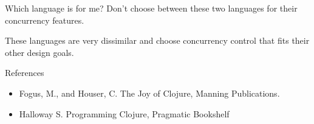 \documentclass[xcolor=dvipsnames]{beamer}
\begin{document}
	\begin{frame}{Which language is for me?}
	Don't choose between these two languages for their concurrency features.
	
	These languages are very dissimilar and choose concurrency control that fits their other design goals. 
	\end{frame}
	
	\begin{frame}{References}
	\begin{itemize}
	\item Fogus, M., and Houser, C. The Joy of Clojure, Manning Publications.
	\item Halloway S. Programming Clojure, Pragmatic Bookshelf
	\end{itemize}
	\end{frame}	
\end{document}
